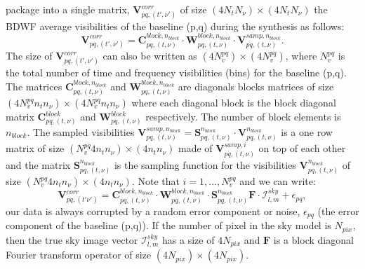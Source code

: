 \documentclass[useAMS,usenatbib]{mn2e}
\begin{document}
package into a single matrix, $\mathbf{V}_{pq,(t',\nu')}^{corr}$ of size $(4N_t N_{\nu})\times (4N_t N_{\nu})$ the 
BDWF average visibilities of the  baseline (p,q) during the synthesis as follows: 
\begin{equation}
\mathbf{V}_{pq,(t',\nu')}^{corr}=\mathbf{C}_{pq,(t,\nu)}^{block,n_{block}}\cdot 
\mathbf{W}_{pq,(t,\nu)}^{block,n_{block}}\cdot\mathbf{V}_{pq,(t,\nu)}^{samp,n_{block}}.\label{eq2:block}
\end{equation}
The size of 
$\mathbf{V}_{pq,(t',\nu')}^{corr}$ can also be written as $(4N_v^{pq})\times (4N_v^{pq})$, where $N_v^{pq}$ is the total
number of time and frequency visibilities (bins) for the baseline (p,q). The matrices
$\mathbf{C}_{pq,(t,\nu)}^{block,n_{block}}$ and $\mathbf{W}_{pq,(t,\nu)}^{block,n_{block}}$ are diagonals blocks 
matrices of size $(4N_v^{pq}n_t n_{\nu})\times (4N_v^{pq}n_t n_{\nu})$ where each diagonal block is the block diagonal matrix  
$\mathbf{C}_{pq,(t,\nu)}^{block}$ and $\mathbf{W}_{pq,(t,\nu)}^{block}$ respectively. The number of block elements is $n_{block}$. The 
sampled  visibilities 
$\textbf{V}_{pq,(t,\nu)}^{samp,n_{block}}=\mathcal{\textbf{S}}_{pq,(t,\nu)}^{n_{block}}\cdot\mathbf{V}_{pq,(t,\nu)}^{n_{block}}$ is a one 
row matrix of size 
$(N_v^{pq}4 n_t n_{\nu})\times (4 n_t n_{\nu})$ made of $\textbf{V}_{pq,(t,\nu)}^{samp,i}$ on top of each other and the matrix 
$\mathcal{\textbf{S}}_{pq,(t,\nu)}^{n_{block}}$ is the sampling function for the visibilities $\mathbf{V}_{pq,(t,\nu)}^{n_{block}}$ of 
size $(N_v^{pq}4 n_t n_{\nu})\times (4 n_t n_{\nu})$. Note that $i=1,\dots, N_v^{pq}$ and we can write:
\begin{equation}
\mathbf{V}_{pq,(t' \nu')}^{corr}= 
\mathbf{C}_{pq,(t,\nu)}^{block,n_{block}}\cdot\mathbf{W}_{pq,(t,\nu)}^{block,n_{block}}\cdot 
\mathbf{S}_{pq,(t,\nu)}^{n_{block}}\mathbf{F}\cdot\mathcal{I}_{l,m}^{sky }+\epsilon_{pq},\label{eqv:linear}
\end{equation}
our data is always corrupted by a random error component or noise, $\epsilon_{pq}$ (the error component of the baseline (p,q)).
If the number of pixel in the sky model is $N_{pix}$, then the true sky image vector $\mathcal{I}_{l,m}^{sky}$ has a size of $4N_{pix}$ and 
$\textbf{F}$ is a block diagonal Fourier transform operator of size $(4N_{pix})\times(4N_{pix})$.
\end{document}
